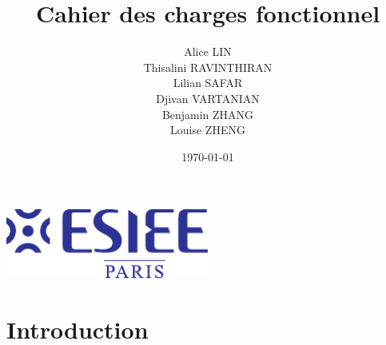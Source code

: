 \documentclass[a4paper,12pt]{report}  %
\title{Cahier des charges fonctionnel}
\author{
	Alice LIN \\
	Thisalini RAVINTHIRAN \\
	Lilian SAFAR \\
	Djivan VARTANIAN \\
	Benjamin ZHANG \\
	Louise ZHENG \\
}
\date{\today}
\begin{document}

\begin{titlepage}
\centering
\vspace*{9cm} 
{\LARGE \bfseries \thetitle \par}
\vspace{1cm} 
\large \theauthor \par
\vspace{0.5cm} 
\large \thedate \par
\vspace{4cm} 
\includegraphics[width=0.5\textwidth]{../Design/FichiersPoster/PDF/Logo_ESIEE.pdf} 
\vfill 
\end{titlepage}



%


\tableofcontents

\pagebreak


\section{Introduction}
\end{document}
